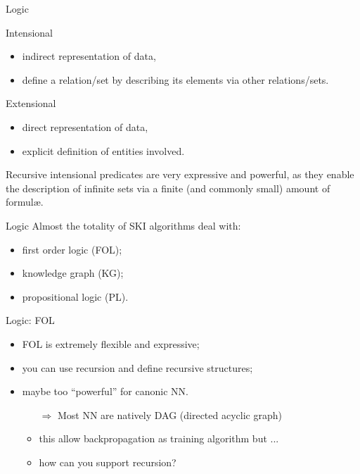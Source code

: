\documentclass[presentation]{beamer}\mode<presentation>{\usetheme{AMSBolognaFC}}
\begin{document}
\begin{frame}[c]{Logic}
    \begin{block}{Intensional}
        \begin{itemize}
            \item indirect representation of data,
            \item define a relation/set by describing its elements via other relations/sets.
        \end{itemize}
    \end{block}
    \begin{block}{Extensional}
        \begin{itemize}
            \item direct representation of data,
            \item explicit definition of entities involved.
        \end{itemize}
    \end{block}
    \vfill
    Recursive intensional predicates are very expressive and powerful, as they enable the description of infinite sets via a finite (and commonly small) amount of formul\ae.
\end{frame}

\begin{frame}[c]{Logic}
    Almost the totality of SKI algorithms deal with:
    \begin{itemize}
        \item first order logic (FOL);
        \item knowledge graph (KG);
        \item propositional logic (PL).
        
    \end{itemize}
\end{frame}

\begin{frame}[c]{Logic: FOL}
    \begin{itemize}
        \item FOL is extremely flexible and expressive;
        \item you can use recursion and define recursive structures;
        \item maybe too ``powerful'' for canonic NN.
        \begin{itemize}
            \item[$\Rightarrow$] Most NN are natively DAG (directed acyclic graph)
            \item this allow backpropagation as training algorithm but ...
            \item how can you support recursion?  
        \end{itemize}
    \end{itemize}
    \centering\vfill
    \phantom{You can't!}
    \phantom{Unless you use some tricks.}
\end{frame}
\end{document}
